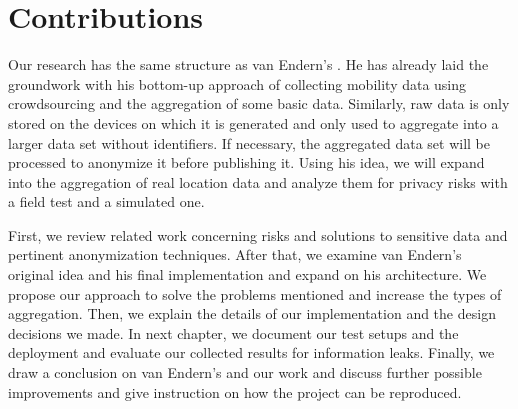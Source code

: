 \section{Contributions}
Our research has the same structure as van Endern's \cite{simon}. He has already laid the groundwork with his bottom-up approach of collecting mobility data using crowdsourcing and the aggregation of some basic data. Similarly, raw data is only stored on the devices on which it is generated and only used to aggregate into a larger data set without identifiers. If necessary, the aggregated data set will be processed to anonymize it before publishing it. Using his idea, we will expand into the aggregation of real location data and analyze them for privacy risks with a field test and a simulated one.

First, we review related work concerning risks and solutions to sensitive data and pertinent anonymization techniques. After that, we examine van Endern's \cite{simon} original idea and his final implementation and expand on his architecture. We propose our approach to solve the  problems mentioned and increase the types of aggregation. Then, we explain the details of our implementation and the design decisions we made. In next chapter, we document our test setups and the deployment and evaluate our collected results for information leaks. Finally, we draw a conclusion on van Endern's \cite{simon} and our work and discuss further possible improvements and give instruction on how the project can be reproduced.
